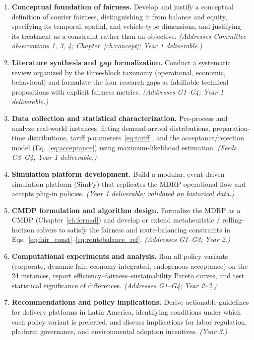 \documentclass[12pt,a4paper]{report}
\begin{document}
\begin{enumerate}[label=\textbf{SO\arabic*.}]
    \item \textbf{Conceptual foundation of fairness.} Develop and justify a conceptual definition of courier fairness, distinguishing it from balance and equity, specifying its temporal, spatial, and vehicle-type dimensions, and justifying its treatment as a constraint rather than an objective. \emph{(Addresses Committee observations 1, 3, 4; Chapter~\ref{ch:concept}; Year 1 deliverable.)}

    \item \textbf{Literature synthesis and gap formalization.} Conduct a systematic review organized by the three-block taxonomy (operational, economic, behavioral) and formulate the four research gaps as falsifiable technical propositions with explicit fairness metrics. \emph{(Addresses G1--G4; Year 1 deliverable.)}

    \item \textbf{Data collection and statistical characterization.} Pre-process and analyze real-world instances, fitting demand-arrival distributions, preparation-time distributions, tariff parameters~\eqref{eq:tariff}, and the acceptance/rejection model (Eq.~\ref{eq:acceptance}) using maximum-likelihood estimation. \emph{(Feeds G3--G4; Year 1 deliverable.)}

    \item \textbf{Simulation platform development.} Build a modular, event-driven simulation platform (SimPy) that replicates the MDRP operational flow and accepts plug-in policies. \emph{(Year 1 deliverable; validated on historical data.)}

    \item \textbf{CMDP formulation and algorithm design.} Formalize the MDRP as a CMDP (Chapter~\ref{ch:formal}) and develop or extend metaheuristic / rolling-horizon solvers to satisfy the fairness and route-balancing constraints in Eqs.~\eqref{eq:fair_const}--\eqref{eq:routebalance_ref}. \emph{(Addresses G1--G3; Year 2.)}

    \item \textbf{Computational experiments and analysis.} Run all policy variants (corporate, dynamic-fair, economy-integrated, endogenous-acceptance) on the 24 instances, report efficiency--fairness--sustainability Pareto curves, and test statistical significance of differences. \emph{(Addresses G1--G4; Year 2--3.)}

    \item \textbf{Recommendations and policy implications.} Derive actionable guidelines for delivery platforms in Latin America, identifying conditions under which each policy variant is preferred, and discuss implications for labor regulation, platform governance, and environmental adoption incentives.
    \emph{(Year 3.)}
\end{enumerate}
\end{document}

